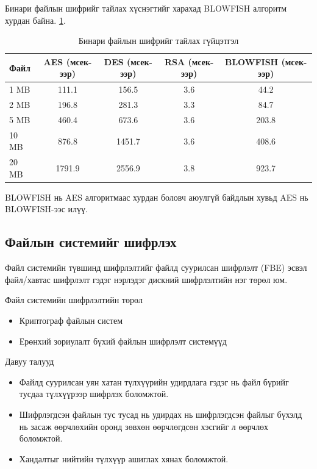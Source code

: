 Бинари файлын шифрийг тайлах хүснэгтийг харахад BLOWFISH алгоритм хурдан байна. \ref{tab:decrypt_performance_binary}.
\begin{table}[H]
    \caption{Бинари файлын шифрийг тайлах гүйцэтгэл}
    \footnotesize
    \begin{tabular}{|l|c|c|c|c|}
        \hline
        \textbf{Файл} & \textbf{AES (мсек-ээр)} & \textbf{DES (мсек-ээр)} & \textbf{RSA (мсек-ээр)} & \textbf{BLOWFISH (мсек-ээр)} \\
        \hline
        1 MB          & 111.1                   & 156.5                   & 3.6                     & 44.2                         \\
        \hline
        2 MB          & 196.8                   & 281.3                   & 3.3                     & 84.7                         \\
        \hline
        5 MB          & 460.4                   & 673.6                   & 3.6                     & 203.8                        \\
        \hline
        10 MB         & 876.8                   & 1451.7                  & 3.6                     & 408.6                        \\
        \hline
        20 MB         & 1791.9                  & 2556.9                  & 3.8                     & 923.7                        \\
        \hline
    \end{tabular}
    \label{tab:decrypt_performance_binary}
\end{table}
BLOWFISH нь AES алгоритмаас хурдан боловч аюулгүй байдлын хувьд AES нь BLOWFISH-ээс илүү.

\subsection*{Файлын системийг шифрлэх}
Файл системийн түвшинд шифрлэлтийг файлд суурилсан шифрлэлт (FBE) эсвэл файл/хавтас шифрлэлт гэдэг нэрлэдэг дискний шифрлэлтийн нэг төрөл юм.\cite{WikiEnFileSystem}

Файл системийн шифрлэлтийн төрөл
\begin{itemize}
    \item Криптограф файлын систем
    \item Ерөнхий зориулалт бүхий файлын шифрлэлт системүүд
\end{itemize}

Давуу талууд
\begin{itemize}
    \item Файлд суурилсан уян хатан түлхүүрийн удирдлага гэдэг нь файл бүрийг тусдаа түлхүүрээр шифрлэх боломжтой.
    \item Шифрлэгдсэн файлын тус тусад нь удирдах нь шифрлэгдсэн файлыг бүхэлд нь засаж өөрчлөхийн оронд зөвхөн өөрчлөгдсөн хэсгийг л өөрчлөх боломжтой.
    \item Хандалтыг нийтийн түлхүүр ашиглах хянах боломжтой.
\end{itemize}

